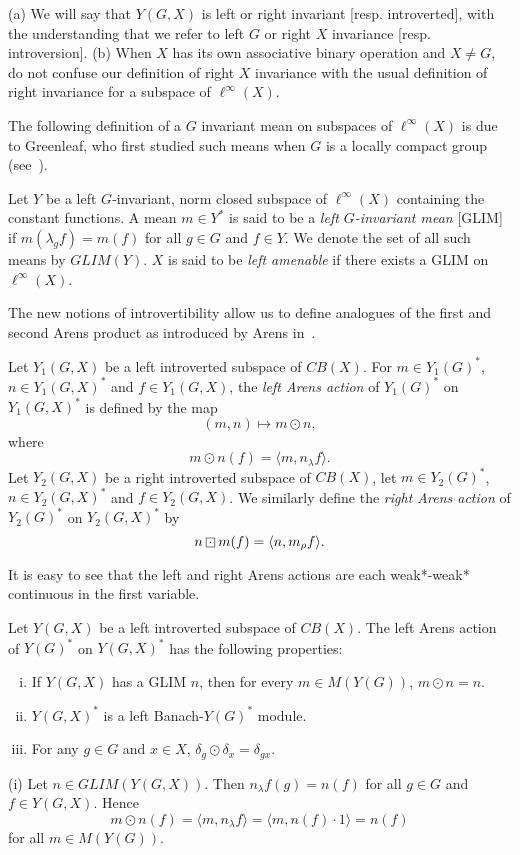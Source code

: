 \begin{remark}
(a) We will say that $Y(G,X)$ is left or right invariant [resp. introverted], with the understanding
that we refer to left $G$ or right $X$ invariance [resp. introversion].
(b) When $X$ has its own associative binary operation and $X\neq G$, do not confuse our definition
of right $X$ invariance with the usual definition of right invariance for 
a subspace of $\ell^\infty(X)$.
\end{remark}

The following definition of a $G$ invariant mean on subspaces of
$\ell^\infty(X)$ is due to Greenleaf, who first studied
such means when $G$ is a locally compact group (see~\cite{gl:aa}).
\begin{defn}\label{aa}
Let $Y$ be a left $G$-invariant, norm closed subspace of $\ell^\infty(X)$ containing the constant
functions.  A mean $m\in Y^*$ is said to be a {\it left $G$-invariant mean} [GLIM] if
$m(\lambda_g f) = m(f)$ for all $g\in G$ and $f\in Y$.  We denote the set of all such means by $GLIM(Y)$.
$X$ is said to be {\it left amenable} if there exists a GLIM on $\ell^\infty(X)$.
\end{defn}

The new notions of introvertibility allow us to define analogues of
the first and second Arens product as introduced by Arens in~\cite{arens}.
\begin{defn}
Let $Y_1(G,X)$ be a left introverted subspace of $CB(X)$.
For $m\in Y_1(G)^*$, $n\in Y_1(G,X)^*$ and $f\in Y_1(G,X)$, the {\it left Arens action}
of $Y_1(G)^*$ on $Y_1(G,X)^*$ is defined by the map
\[
(m,n) \mapsto m\odot n,
\]
where
\[
m\odot n(f) = \langle m, n_\lambda f\rangle.
\]
Let $Y_2(G,X)$ be a right introverted subspace of $CB(X)$, let
$m\in Y_2(G)^*$, $n\in Y_2(G,X)^*$ and $f\in Y_2(G,X)$.  We similarly define
the {\it right Arens action} of $Y_2(G)^*$ on $Y_2(G,X)^*$ by
\[
n\dotbox m(f) = \langle n, m_\rho f\rangle.
\]
\end{defn}

It is easy to see that the left and right Arens actions are each weak*-weak*
continuous in the first variable.

\begin{proposition}\label{arens:G-inv}
Let $Y(G,X)$ be a left introverted subspace of $CB(X)$.
The left Arens action of $Y(G)^*$ on $Y(G,X)^*$ has the following
properties:
\begin{enumerate}[(i)]
\item If $Y(G,X)$ has a GLIM $n$, then for every $m\in M(Y(G))$, $m\odot n = n$.
\item $Y(G,X)^*$ is a left Banach-$Y(G)^*$ module.
\item For any $g\in G$ and $x\in X$, $\delta_g\odot\delta_x = \delta_{gx}$.
\end{enumerate}
\end{proposition}
\proof
(i) Let $n\in GLIM(Y(G,X))$.  Then $n_\lambda f(g) = n(f)$ for all $g\in G$ and $f\in Y(G,X)$.  Hence
\[
m \odot n(f) = \langle m,n_\lambda f\rangle = \langle m, n(f)\cdot 1\rangle = n(f)
\]
for all $m\in M(Y(G))$.

